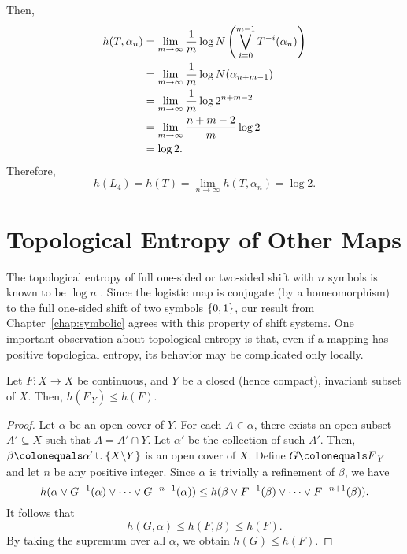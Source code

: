 \documentclass[10pt,twoside,draft]{book}
\begin{document}
Then,
\begin{align*}
  h(T, \alpha_n)
  &= \lim\limits_{m \to \infty} \frac{1}{m} \log N\left (  \bigvee\limits_{i = 0}^{m-1} T^{-i}(\alpha_n) \right )  \\
  &= \lim\limits_{m \to \infty} \frac{1}{m} \log N(\alpha_{n+m-1})  \\
  &= \lim\limits_{m \to \infty} \frac{1}{m} \log 2^{n + m - 2}  \\
  &= \lim\limits_{m \to \infty} \frac{n + m - 2}{m} \log 2 \\
  &= \log 2.
\end{align*}
Therefore,
\begin{equation*}
  h(L_4) = h(T) = \lim\limits_{n \to \infty} h(T, \alpha_n) = \log 2.
\end{equation*}

\section{Topological Entropy of Other Maps}
The topological entropy of full one-sided or two-sided shift with $n$ symbols is known to be $\log n$ \citep[p.177]{walters}.
Since the logistic map is conjugate (by a homeomorphism) to the full one-sided shift of two symbols $\left \{ 0,1 \right \}$, our result from Chapter~\ref{chap:symbolic} agrees with this property of shift systems.
One important observation about topological entropy is that, even if a mapping has positive topological entropy, its behavior may be complicated only locally.
\begin{proposition}
  Let $F: X \to X$ be continuous, and $Y$ be a closed (hence compact), invariant subset of $X$.
  Then, $h(F_{|Y}) \leq h(F)$.
  \label{prop:local-entropy}
  \begin{proof}
    Let $\alpha$ be an open cover of $Y$.
    For each $A \in \alpha$, there exists an open subset $A' \subseteq X$ such that $A = A' \cap Y$.
    Let $\alpha'$ be the collection of such $A'$.
    Then, $\beta \ceq \alpha' \cup \set{X\bs Y}$ is an open cover of $X$.
    Define $G \ceq F_{|Y}$ and let $n$ be any positive integer.
    Since $\alpha$ is trivially a refinement of $\beta$, we have
    \begin{equation*}
      h(\alpha \vee G^{-1}(\alpha) \vee \cdots \vee G^{-n+1}(\alpha)) 
      \leq
      h(\beta \vee F^{-1}(\beta) \vee \cdots \vee F^{-n+1}(\beta)).
    \end{equation*}
    It follows that
    \begin{equation*}
      h(G, \alpha) \leq h(F, \beta) \leq h(F).
    \end{equation*}
    By taking the supremum over all $\alpha$, we obtain $h(G) \leq h(F)$.
  \end{proof}
\end{proposition}
\end{document}

